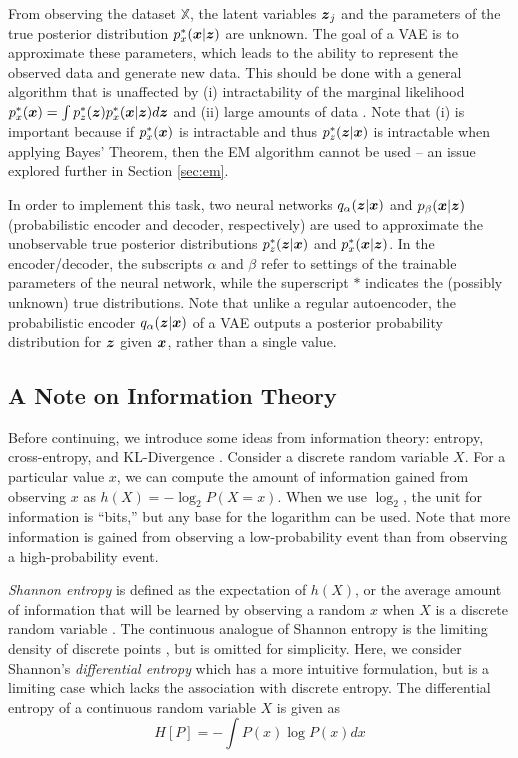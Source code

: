From observing the dataset $\mathbb{X}$, the latent variables $\boldsymbol{z}_j$ and the parameters of the true posterior distribution $p_x^*(\boldsymbol{x} | \boldsymbol{z})$ are unknown. The goal of a VAE is to approximate these parameters, which leads to the ability to represent the observed data and generate new data. This should be done with a general algorithm that is unaffected by (i) intractability of the marginal likelihood $p_x^*(\boldsymbol{x}) = \int p_z^*(\boldsymbol{z}) p_x^*(\boldsymbol{x} | \boldsymbol{z}) d\boldsymbol{z}$ and (ii) large amounts of data \cite{kingma2014}. Note that (i) is important because if $p_x^*(\boldsymbol{x})$ is intractable and thus $p_z^*(\boldsymbol{z} | \boldsymbol{x})$ is intractable when applying Bayes' Theorem, then the EM algorithm cannot be used -- an issue explored further in Section \ref{sec:em}.

In order to implement this task, two neural networks $q_\alpha(\boldsymbol{z} | \boldsymbol{x})$ and $p_\beta(\boldsymbol{x} | \boldsymbol{z})$ (probabilistic encoder and decoder, respectively) are used to approximate the unobservable true posterior distributions $p_z^*(\boldsymbol{z}| \boldsymbol{x})$ and $p_x^*(\boldsymbol{x} | \boldsymbol{z})$. In the encoder/decoder, the subscripts $\alpha$ and $\beta$ refer to settings of the trainable parameters of the neural network, while the superscript $*$ indicates the (possibly unknown) true distributions. Note that unlike a regular autoencoder, the probabilistic encoder $q_\alpha(\boldsymbol{z} | \boldsymbol{x})$ of a VAE outputs a posterior probability distribution for $\boldsymbol{z}$ given $\boldsymbol{x}$, rather than a single value.

\subsection{A Note on Information Theory}
Before continuing, we introduce some ideas from information theory: entropy, cross-entropy, and KL-Divergence \cite{pattern_rec_book}. Consider a discrete random variable $X$. For a particular value $x$, we can compute the amount of information gained from observing $x$ as $h(X) = -\log_2 P(X=x)$. When we use $\log_2$, the unit for information is ``bits,'' but any base for the logarithm can be used. Note that more information is gained from observing a low-probability event than from observing a high-probability event. 

\textit{Shannon entropy} is defined as the expectation of $h(X)$, or the average amount of information that will be learned by observing a random $x$ when $X$ is a discrete random variable \cite{shannon1948}. The continuous analogue of Shannon entropy is the limiting density of discrete points \cite{jaynes1957}, but is omitted for simplicity. Here, we consider Shannon's \textit{differential entropy} which has a more intuitive formulation, but is a limiting case which lacks the association with discrete entropy. The differential entropy of a continuous random variable $X$ is given as 
\begin{equation}
  H[P] = - \int P(x) \log P(x)dx
  \label{eq:entropy}
\end{equation}

